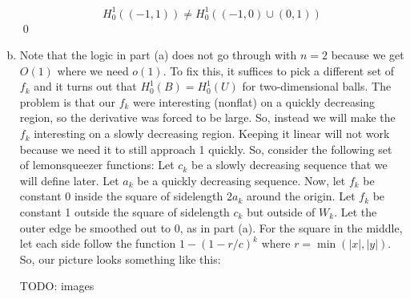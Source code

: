 \documentclass{article}
\begin{document}
\begin{enumerate}[(a)]
    \[ H_0^1((-1,1)) \ne H_0^1((-1,0) \cup (0,1))\]
    \qed
    \item Note that the logic in part (a) does not go through with $n=2$ because we get $O(1)$ where we need $o(1)$. To fix this, it suffices to pick a different set of $f_k$ and it turns out that $H_0^1(B) = H_0^1(U)$ for two-dimensional balls. The problem is that our $f_k$ were interesting (nonflat) on a quickly decreasing region, so the derivative was forced to be large. 
    \hop
    So, instead we will make the $f_k$ interesting on a slowly decreasing region. Keeping it linear will not work because we need it to still approach 1 quickly. So, consider the following set of lemonsqueezer functions:
    \hop 
    Let $c_k$ be a slowly decreasing sequence that we will define later. Let $a_k$ be a quickly decreasing sequence. Now, let $f_k$ be constant 0 inside the square of sidelength $2a_k$ around the origin. Let $f_k$ be constant 1 outside the square of sidelength $c_k$ but outside of $W_k$. Let the outer edge be smoothed out to 0, as in part (a). For the square in the middle, let each side follow the function $1 - (1-r/c)^{k}$ where $r = \min(|x|, |y|)$. So, our picture looks something like this: 

    TODO: images


\end{enumerate}
\end{document}

